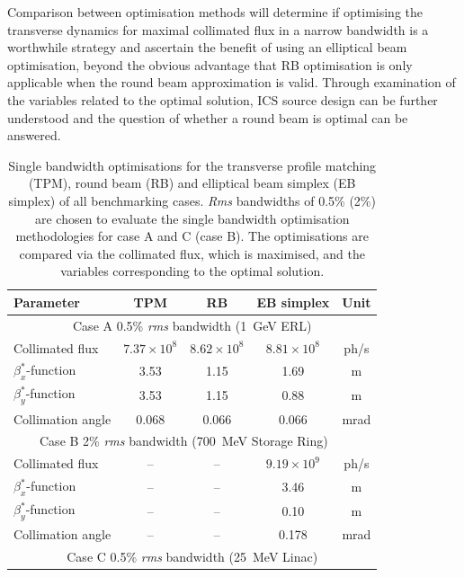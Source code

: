 \documentclass[../main.tex]{subfiles}
\begin{document}
Comparison between optimisation methods will determine if optimising the transverse dynamics for maximal collimated flux in a narrow bandwidth is a worthwhile strategy and ascertain the benefit of using an elliptical beam optimisation, beyond the obvious advantage that RB optimisation is only applicable when the round beam approximation is valid. Through examination of the variables related to the optimal solution, ICS source design can be further understood and the question of whether a round beam is optimal can be answered.      
\begin{table}[!h]
\centering
\caption{Single bandwidth optimisations for the transverse profile matching (TPM), round beam (RB) and elliptical beam simplex (EB simplex) of all benchmarking cases. \textit{Rms} bandwidths of 0.5\% (2\%) are chosen to evaluate the single bandwidth optimisation methodologies for case A and C (case B). The optimisations are compared via the collimated flux, which is maximised, and the variables corresponding to the optimal solution.}
\vspace{3mm}
\begin{threeparttable}
\begin{tabular}{lcccc}
\hline\hline
Parameter & TPM & RB & EB simplex & Unit \\
\hline
\multicolumn{5}{c}{Case A 0.5\% \textit{rms} bandwidth (1~\si{\giga\electronvolt} ERL)} \\
\hline
Collimated flux & $7.37\times 10^{8}$ & $8.62\times 10^{8}$ & $8.81\times 10^{8}$ & ph/\si{\second} \\
$\beta_{x}^{*}$-function & 3.53 & 1.15 & 1.69 & \si{\meter}\\
$\beta_{y}^{*}$-function & 3.53 & 1.15 & 0.88 & \si{\meter}\\
Collimation angle & 0.068 & 0.066 & 0.066 & \si{\milli\radian}\\
\hline
\multicolumn{5}{c}{Case B 2\% \textit{rms} bandwidth (700~\si{\mega\electronvolt} Storage Ring)~\tnote{*} ~\tnote{$\dagger$}}  \\
\hline
Collimated flux & -- & -- & $9.19\times 10^{9}$ & ph/\si{\second} \\
$\beta_{x}^{*}$-function & -- & -- & 3.46 & \si{\meter} \\
$\beta_{y}^{*}$-function & -- & -- & 0.10 & \si{\meter} \\
Collimation angle & -- & -- & 0.178 & \si{\milli\radian} \\ 
\hline
\multicolumn{5}{c}{Case C 0.5\% \textit{rms} bandwidth (25~\si{\mega\electronvolt} Linac)} \\

\end{tabular}
\end{threeparttable}
\end{table}
\end{document}
